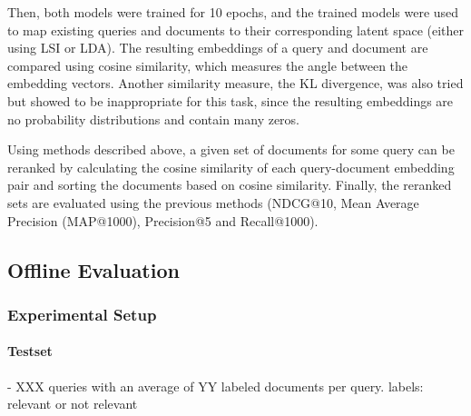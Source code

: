 
Then, both models were trained for 10 epochs, and the trained models were used to map existing queries and documents to their corresponding latent space (either using LSI or LDA). The resulting embeddings of a query and document are compared using cosine similarity, which measures the angle between the embedding vectors. Another similarity measure, the KL divergence, was also tried but showed to be inappropriate for this task, since the resulting embeddings are no probability distributions and contain many zeros.

Using methods described above, a given set of documents for some query can be reranked by calculating the cosine similarity of each query-document embedding pair and sorting the documents based on cosine similarity. Finally, the reranked sets are evaluated using the previous methods (NDCG@10, Mean Average Precision (MAP@1000), Precision@5 and Recall@1000).




\subsection{Offline Evaluation}
\label{DistributionalSemantics:Evaluation}

\subsubsection{Experimental Setup}

\paragraph{Testset}
- XXX queries with an average of YY labeled documents per query.
labels: relevant or not relevant

